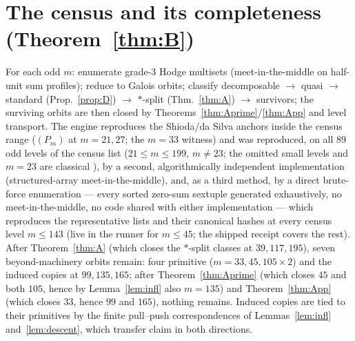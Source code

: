 \documentclass[11pt]{amsart}
\theoremstyle{remark}
\begin{document}
\section{The census and its completeness (Theorem~\ref{thm:B})}\label{sec:B}
For each odd $m$: enumerate grade-$3$ Hodge multisets (meet-in-the-middle on half-unit sum profiles);
reduce to Galois orbits; classify decomposable $\to$ quasi $\to$ standard (Prop.~\ref{prop:D}) $\to$
$*$-split (Thm.~\ref{thm:A}) $\to$ survivors; the surviving orbits are then closed by
Theorems~\ref{thm:Aprime}/\ref{thm:App} and level transport. The engine reproduces
the Shioda/da Silva anchors inside the census range ($(P_m)$ at $m=21,27$; the $m=33$ witness) and was reproduced, on all $89$
odd levels of the census list ($21\le m\le199$, $m\neq23$; the omitted small levels and $m=23$ are
classical \cite[Thms.~2.6--2.7]{daSilva}), by a second, algorithmically independent
implementation (structured-array meet-in-the-middle), and, as a third method, by a direct
brute-force enumeration --- every sorted zero-sum sextuple generated exhaustively, no
meet-in-the-middle, no code shared with either implementation --- which reproduces the
representative lists and their canonical hashes at every census level $m\le143$ (live in the
runner for $m\le45$; the shipped receipt covers the rest). After Theorem~\ref{thm:A} (which closes the
$*$-split classes at $39,117,195$), seven beyond-machinery orbits remain: four primitive
($m=33,45,105\times2$) and the induced copies at $99,135,165$; after Theorem~\ref{thm:Aprime} (which closes $45$ and both $105$, hence by Lemma~\ref{lem:infl}
also $m=135$) and Theorem~\ref{thm:App} (which closes $33$, hence $99$ and $165$),
nothing remains. Induced copies are tied to their primitives by the finite pull--push
correspondences of Lemmas~\ref{lem:infl} and~\ref{lem:descent}, which transfer claim in both
directions.
\end{document}
